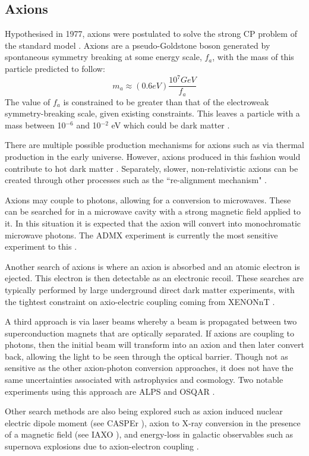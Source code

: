 \subsection{Axions}
\par
Hypothesised in 1977, axions were postulated to solve the strong CP problem of the standard model \cite{axion_origins_ref}.
Axions are a pseudo-Goldstone boson generated by spontaneous symmetry breaking at some energy scale, $f_a$, with the mass of this particle predicted to follow:
\begin{equation}
    m_a \approx (0.6eV)\frac{10^7 GeV}{f_a}
\end{equation}
The value of $f_a$ is constrained to be greater than that of the electroweak symmetry-breaking scale, given existing constraints.
This leaves a particle with a mass between 10${}^{-6}$ and 10${}^{-2}$ eV which could be dark matter \cite{axions_ref}.
\par
There are multiple possible production mechanisms for axions such as via thermal production in the early universe.
However, axions produced in this fashion would contribute to hot dark matter \cite{hot_axions_ref}.
Separately, slower, non-relativistic axions can be created through other processes such as the ``re-alignment mechanism" \cite{cold_axion_ref}.
\par
Axions may couple to photons, allowing for a conversion to microwaves.
These can be searched for in a microwave cavity with a strong magnetic field applied to it.
In this situation it is expected that the axion will convert into monochromatic microwave photons.
The ADMX experiment is currently the most sensitive experiment to this \cite{admx_experiment_ref}.
\par
Another search of axions is where an axion is absorbed and an atomic electron is ejected.
This electron is then detectable as an electronic recoil.
These searches are typically performed by large underground direct dark matter experiments, with the tightest constraint on axio-electric coupling coming from XENONnT \cite{xenonnt_sr1_er_ref}.
\par
A third approach is via laser beams whereby a beam is propagated between two superconduction magnets that are optically separated.
If axions are coupling to photons, then the initial beam will transform into an axion and then later convert back, allowing the light to be seen through the optical barrier.
Though not as sensitive as the other axion-photon conversion approaches, it does not have the same uncertainties associated with astrophysics and cosmology.
Two notable experiments using this approach are ALPS \cite{alps_axion_result_ref} and OSQAR \cite{osqar_axion_result_ref}. 
\par
Other search methods are also being explored such as axion induced nuclear electric dipole moment (see CASPEr \cite{casper_experiment_ref}), axion to X-ray conversion in the presence of a magnetic field (see IAXO \cite{iaxo_experiment_ref}), and energy-loss in galactic observables such as supernova explosions due to axion-electron coupling \cite{axions_from_supernova_ref}.

